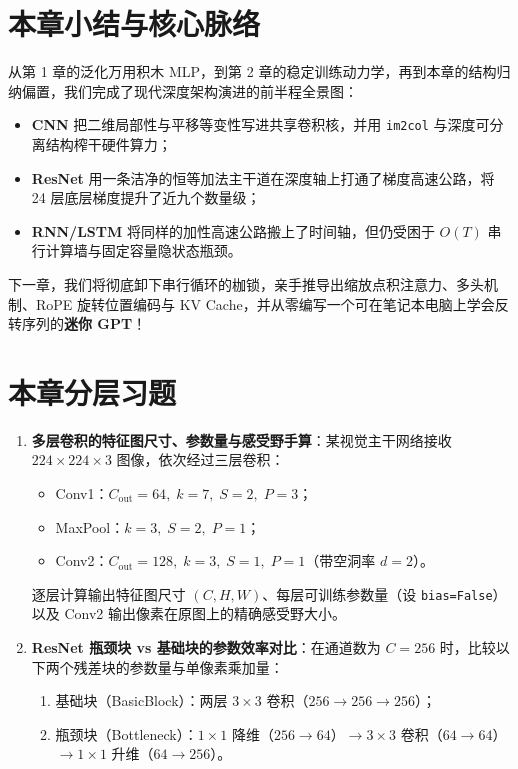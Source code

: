 \section*{本章小结与核心脉络}

从第 1 章的泛化万用积木 MLP，到第 2 章的稳定训练动力学，再到本章的结构归纳偏置，我们完成了现代深度架构演进的前半程全景图：
\begin{itemize}
  \item \textbf{CNN} 把二维局部性与平移等变性写进共享卷积核，并用 \texttt{im2col} 与深度可分离结构榨干硬件算力；
  \item \textbf{ResNet} 用一条洁净的恒等加法主干道在深度轴上打通了梯度高速公路，将 24 层底层梯度提升了近九个数量级；
  \item \textbf{RNN/LSTM} 将同样的加性高速公路搬上了时间轴，但仍受困于 $O(T)$ 串行计算墙与固定容量隐状态瓶颈。
\end{itemize}
下一章，我们将彻底卸下串行循环的枷锁，亲手推导出缩放点积注意力、多头机制、RoPE 旋转位置编码与 KV Cache，并从零编写一个可在笔记本电脑上学会反转序列的\textbf{迷你 GPT}！

\section*{本章分层习题}


\begin{enumerate}
  \item[\textbf{5.3.1}] \textbf{多层卷积的特征图尺寸、参数量与感受野手算}：某视觉主干网络接收 $224 \times 224 \times 3$ 图像，依次经过三层卷积：
  \begin{itemize}
    \item Conv1：$C_{\text{out}} = 64,\; k = 7,\; S = 2,\; P = 3$；
    \item MaxPool：$k = 3,\; S = 2,\; P = 1$；
    \item Conv2：$C_{\text{out}} = 128,\; k = 3,\; S = 1,\; P = 1$（带空洞率 $d = 2$）。
  \end{itemize}
  逐层计算输出特征图尺寸 $(C, H, W)$、每层可训练参数量（设 \texttt{bias=False}）以及 Conv2 输出像素在原图上的精确感受野大小。

  \item[\textbf{5.3.2}] \textbf{ResNet 瓶颈块 vs 基础块的参数效率对比}：在通道数为 $C = 256$ 时，比较以下两个残差块的参数量与单像素乘加量：
  \begin{enumerate}
    \item 基础块（BasicBlock）：两层 $3\times 3$ 卷积（$256 \to 256 \to 256$）；
    \item 瓶颈块（Bottleneck）：$1\times 1$ 降维（$256 \to 64$）$\to 3\times 3$ 卷积（$64 \to 64$）$\to 1\times 1$ 升维（$64 \to 256$）。
  \end{enumerate}
\end{enumerate}

